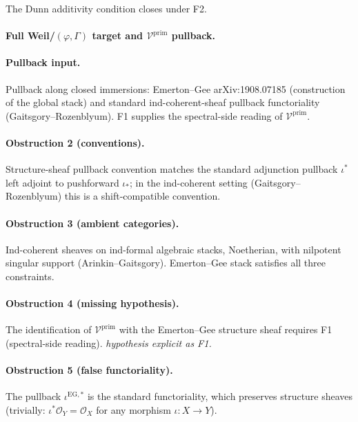 The Dunn additivity condition closes under F2.

\paragraph{Full Weil/\((\varphi,\Gamma)\) target and \(\mathcal{V}^{\mathrm{prim}}\) pullback.}

\paragraph{Pullback input.} Pullback along closed
immersions: Emerton--Gee arXiv:1908.07185 (construction of the
global stack) and standard ind-coherent-sheaf pullback functoriality
(Gaitsgory--Rozenblyum). F1 supplies the spectral-side reading
of \(\mathcal{V}^{\mathrm{prim}}\).

\paragraph{Obstruction 2 (conventions).} Structure-sheaf pullback
convention matches the standard adjunction pullback \(\iota^{*}\)
left adjoint to pushforward \(\iota_{*}\); in the ind-coherent
setting (Gaitsgory--Rozenblyum) this is a shift-compatible
convention.

\paragraph{Obstruction 3 (ambient categories).} Ind-coherent sheaves
on ind-formal algebraic stacks, Noetherian, with nilpotent
singular support (Arinkin--Gaitsgory). Emerton--Gee stack satisfies
all three constraints.

\paragraph{Obstruction 4 (missing hypothesis).} The identification of
\(\mathcal{V}^{\mathrm{prim}}\) with the Emerton--Gee structure
sheaf requires F1 (spectral-side reading). \emph{hypothesis
explicit as F1.}

\paragraph{Obstruction 5 (false functoriality).} The pullback
\(\iota^{\mathrm{EG},*}\) is the standard functoriality, which
preserves structure sheaves (trivially: \(\iota^{*}\mathcal{O}_{Y}=\mathcal{O}_{X}\)
for any morphism \(\iota\colon X\to Y\)).

